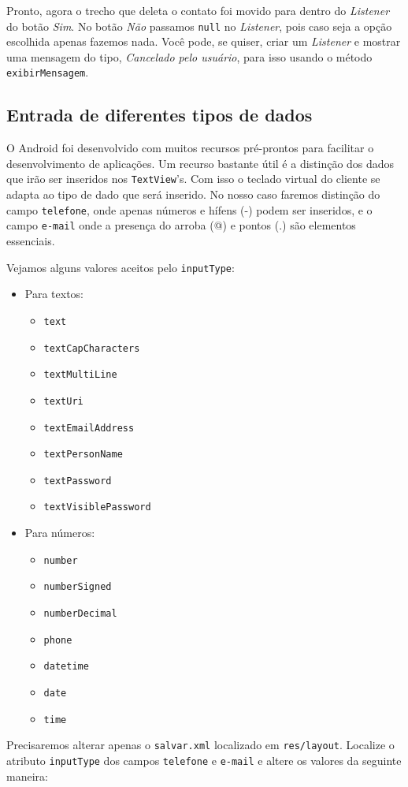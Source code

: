 Pronto, agora o trecho que deleta o contato foi movido para dentro do
\emph{Listener} do botão \emph{Sim}. No botão \emph{Não} passamos
\texttt{null} no \emph{Listener}, pois caso seja a opção escolhida
apenas fazemos nada. Você pode, se quiser, criar um \emph{Listener} e
mostrar uma mensagem do tipo, \emph{Cancelado pelo usuário}, para isso
usando o método \texttt{exibirMensagem}.

\subsection{Entrada de diferentes tipos de dados}

O Android foi desenvolvido com muitos recursos pré-prontos para
facilitar o desenvolvimento de aplicações. Um recurso bastante útil é a
distinção dos dados que irão ser inseridos nos \texttt{TextView}'s. Com
isso o teclado virtual do cliente se adapta ao tipo de dado que será
inserido. No nosso caso faremos distinção do campo \texttt{telefone},
onde apenas números e hífens (-) podem ser inseridos, e o campo
\texttt{e-mail} onde a presença do arroba (@) e pontos (.) são elementos
essenciais.

Vejamos alguns valores aceitos pelo \texttt{inputType}:

\begin{itemize}
\item
  Para textos:
  \begin{itemize}
  \item
    \texttt{text}
  \item
    \texttt{textCapCharacters}
  \item
    \texttt{textMultiLine}
  \item
    \texttt{textUri}
  \item
    \texttt{textEmailAddress}
  \item
    \texttt{textPersonName}
  \item
    \texttt{textPassword}
  \item
    \texttt{textVisiblePassword}
  \end{itemize}
\item
  Para números:
  \begin{itemize}
  \item
    \texttt{number}
  \item
    \texttt{numberSigned}
  \item
    \texttt{numberDecimal}
  \item
    \texttt{phone}
  \item
    \texttt{datetime}
  \item
    \texttt{date}
  \item
    \texttt{time}
  \end{itemize}
\end{itemize}
Precisaremos alterar apenas o \texttt{salvar.xml} localizado em
\texttt{res/layout}. Localize o atributo \texttt{inputType} dos campos
\texttt{telefone} e \texttt{e-mail} e altere os valores da seguinte
maneira:

